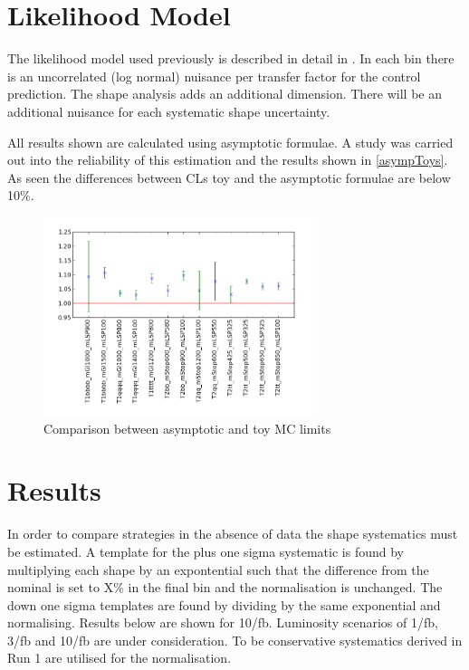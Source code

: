 \section{Likelihood Model}

The likelihood model used previously is described in detail in \cite{search}. 
In each \scalhtcat bin there is an uncorrelated (log normal) nuisance per transfer factor for the control prediction. The shape analysis adds an additional dimension.
There will be an additional nuisance for each systematic shape uncertainty.

All results shown are calculated using asymptotic formulae. 
A study was carried out into the reliability of this estimation and the results shown in \ref{asympToys}. 
As seen the differences between CLs toy and the asymptotic formulae are below 10\%.

\begin{figure}
  \centering
     \includegraphics[width=0.7\textwidth]{Figures/asympToys.png}
  \caption{Comparison between asymptotic and toy MC limits}
  \label{fig:asympToys}
\end{figure}

\section{Results}

In order to compare strategies in the absence of data the shape systematics must be estimated. A template for the plus one sigma systematic is found by multiplying each shape by an expontential such that 
the difference from the nominal is set to X\% in the final bin 
and the normalisation is unchanged. The down one sigma templates are found by 
dividing by the same exponential and normalising. Results below are shown
for 10/fb. Luminosity scenarios of 1/fb, 3/fb and 10/fb are under consideration.
To be conservative systematics derived in Run 1 are utilised for the normalisation.

